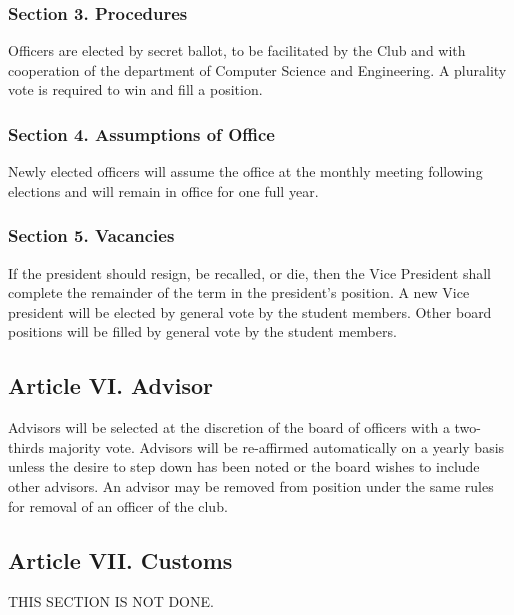 \documentclass{article}
\begin{document}
    \subsubsection{Section 3. Procedures}
      Officers are elected by secret ballot, to be facilitated by the Club and with cooperation of the department of Computer Science and Engineering. A plurality vote is required to win and fill a position.

    \subsubsection{Section 4. Assumptions of Office}
      Newly elected officers will assume the office at the monthly meeting following elections and will remain in office for one full year.

    \subsubsection{Section 5. Vacancies}
      If the president should resign, be recalled, or die, then the Vice President shall complete the remainder of the term in the president’s position. A new Vice president will be elected by general vote by the student members.  Other board positions will be filled by general vote by the student members.

  \subsection{Article VI. Advisor}
    Advisors will be selected at the discretion of the board of officers with a two-thirds majority vote. Advisors will be re-affirmed automatically on a yearly basis unless the desire to step down has been noted or the board wishes to include other advisors. An advisor may be removed from position under the same rules for removal of an officer of the club.

  \subsection{Article VII. Customs}
    THIS SECTION IS NOT DONE.
\end{document}
